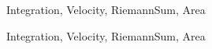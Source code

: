 \begin{tagblock}{Integration, Velocity, RiemannSum, Area}
\begin{question}
\begin{enumerate}
\end{enumerate}


	
	
\begin{tags}
	    Integration, Velocity, RiemannSum, Area
\end{tags}
	
\begin{diary}
\end{diary}
	
\begin{solution}
	   
	    \end{enumerate}
\end{solution}
	
\end{question}

\end{tagblock}


